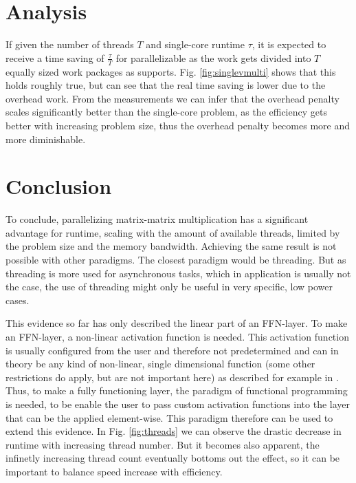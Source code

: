 \documentclass{article}
\begin{document}
\section{Analysis}
If given the number of threads $T$ and single-core runtime $\tau$, it is expected to receive a time saving of $\frac{\tau}{T}$ for parallelizable as the work gets divided into $T$ equally sized work packages as \cite{opencsf} supports. Fig. \ref{fig:singlevmulti} shows that this holds roughly true, but can see that the real time saving is lower due to the overhead work. From the measurements we can infer that the overhead penalty scales significantly better than the single-core problem, as the efficiency gets better with increasing problem size, thus the overhead penalty becomes more and more diminishable. 

\section{Conclusion}
To conclude, parallelizing matrix-matrix multiplication has a significant advantage for runtime, scaling with the amount of available threads, limited by the problem size and the memory bandwidth. Achieving the same result is not possible with other paradigms. The closest paradigm would be threading. But as threading is more used for asynchronous tasks, which in application is usually not the case, the use of threading might only be useful in very specific, low power cases. 

This evidence so far has only described the linear part of an FFN-layer. To make an FFN-layer, a non-linear activation function is needed. This activation function is usually configured from the user and therefore not predetermined and can in theory be any kind of non-linear, single dimensional function (some other restrictions do apply, but are not important here) as described for example in \cite{Goodfellow-et-al-2016}. Thus, to make a fully functioning layer, the paradigm of functional programming is needed, to be enable the user to pass custom activation functions into the layer that can be the applied element-wise. This paradigm therefore can be used to extend this evidence.  
In Fig. \ref{fig:threads} we can observe the drastic decrease in runtime with increasing thread number.
But it becomes also apparent, the infinetly increasing thread count eventually bottoms out the effect, 
so it can be important to balance speed increase with efficiency.



\end{document}
